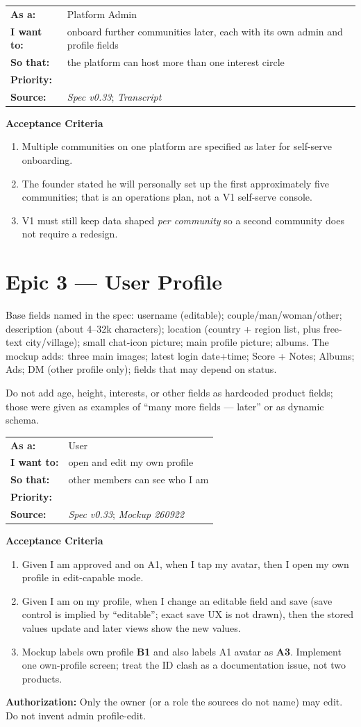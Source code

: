 \documentclass[11pt,a4paper]{article}
\makeatletter
\newcommand{\priPzero}{\colorbox{p0}{\makebox[4.6em]{\textcolor{white}{\scriptsize\bfseries P0 V1}}}}
\newcommand{\priPtwo}{\colorbox{p2}{\makebox[4.6em]{\textcolor{white}{\scriptsize\bfseries P2 Later}}}}
\newcommand{\srcSpec}{\textit{Spec v0.33}}
\newcommand{\srcTx}{\textit{Transcript}}
\newcommand{\srcMock}{\textit{Mockup 260922}}
\newenvironment{story}[1]{%
  \Needspace{10\baselineskip}%
  \vspace{0.7em}%
  \noindent
  \colorbox{navy}{\makebox[\dimexpr\textwidth-2\fboxsep\relax][l]{\textcolor{white}{\bfseries\ #1}}}%
  \par\vspace{0.35em}%
}{\par\vspace{0.55em}}
\newcommand{\storymeta}[5]{%
  \noindent
  \begin{tabularx}{\textwidth}{@{}>{\bfseries}l X@{}}
    As a: & #1 \\
    I want to: & #2 \\
    So that: & #3 \\
    Priority: & #4 \\
    Source: & #5 \\
  \end{tabularx}
  \par\vspace{0.3em}
}
\newcommand{\achead}{\noindent\textbf{Acceptance Criteria}\par}
\newcommand{\authz}[1]{\noindent\textbf{Authorization:} #1\par}
\makeatother
\begin{document}
\begin{story}{COMM-007 --- Additional communities later}
\storymeta{Platform Admin}{onboard further communities later, each with its own admin and profile fields}{the platform can host more than one interest circle}{\priPtwo}{\srcSpec; \srcTx}
\achead
\begin{enumerate}
  \item Multiple communities on one platform are specified as later for self-serve onboarding.
  \item The founder stated he will personally set up the first approximately five communities; that is an operations plan, not a V1 self-serve console.
  \item V1 must still keep data shaped \emph{per community} so a second community does not require a redesign.
\end{enumerate}
\end{story}

\section{Epic 3 --- User Profile}
Base fields named in the spec: username (editable); couple/man/woman/other; description (about 4--32k characters); location (country + region list, plus free-text city/village); small chat-icon picture; main profile picture; albums. The mockup adds: three main images; latest login date+time; Score + Notes; Albums; Ads; DM (other profile only); fields that may depend on status.

Do not add age, height, interests, or other fields as hardcoded product fields; those were given as examples of ``many more fields --- later'' or as dynamic schema.

\begin{story}{PROF-001 --- View and edit own profile}
\storymeta{User}{open and edit my own profile}{other members can see who I am}{\priPzero}{\srcSpec; \srcMock}
\achead
\begin{enumerate}
  \item Given I am approved and on A1, when I tap my avatar, then I open my own profile in edit-capable mode.
  \item Given I am on my profile, when I change an editable field and save (save control is implied by ``editable''; exact save UX is not drawn), then the stored values update and later views show the new values.
  \item Mockup labels own profile \textbf{B1} and also labels A1 avatar as \textbf{A3}. Implement one own-profile screen; treat the ID clash as a documentation issue, not two products.
\end{enumerate}
\authz{Only the owner (or a role the sources do not name) may edit. Do not invent admin profile-edit.}
\end{story}
\end{document}
